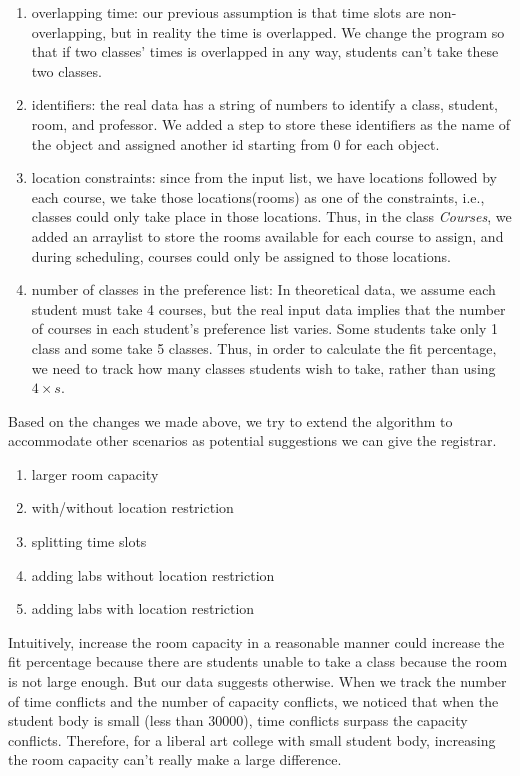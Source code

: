\documentclass[11pt, oneside]{article}   	%
\begin{document}
\begin{enumerate}
    \item overlapping time: our previous assumption is that time slots are non-overlapping, but in reality the time is overlapped. We change the program so that if two classes' times is overlapped in any way, students can't take these two classes.
    \item identifiers: the real data has a string of numbers to identify a class, student, room, and professor. We added a step to store these identifiers as the name of the object and assigned another id starting from 0 for each object. 
    \item location constraints: since from the input list, we have locations followed by each course, we take those locations(rooms) as one of the constraints, i.e., classes could only take place in those locations. Thus, in the class \emph{Courses}, we added an arraylist to store the rooms available for each course to assign, and during scheduling, courses could only be assigned to those locations.
    \item number of classes in the preference list: In theoretical data, we assume each student must take 4 courses, but the real input data implies that the number of courses in each student's preference list varies. Some students take only 1 class and some take 5 classes. Thus, in order to calculate the fit percentage, we need to track how many classes students wish to take, rather than using $4\times s$.
\end{enumerate}

Based on the changes we made above, we try to extend the algorithm to accommodate other scenarios as potential suggestions we can give the registrar. 

\begin{enumerate}
    \item larger room capacity
    \item with/without location restriction
    \item splitting time slots
    \item adding labs without location restriction
    \item adding labs with location restriction
\end{enumerate}

Intuitively, increase the room capacity in a reasonable manner could increase the fit percentage because there are students unable to take a class because the room is not large enough. But our data suggests otherwise. When we track the number of time conflicts and the number of capacity conflicts, we noticed that when the student body is small (less than 30000), time conflicts surpass the capacity conflicts. Therefore, for a liberal art college with small student body, increasing the room capacity can't really make a large difference. 
\end{document}
